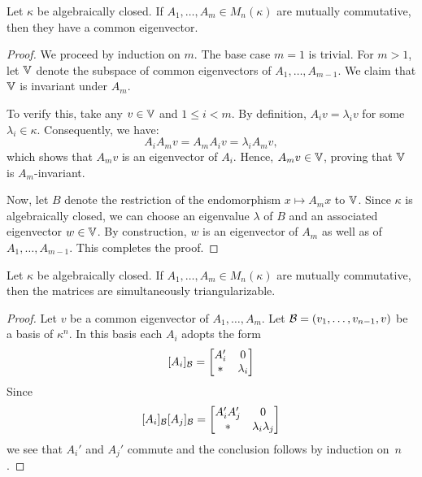 \begin{lem}\label{lem:common-eigenvector}
    Let\/ $\kappa$ be algebraically closed. If\/ $A_1,\dots, A_m\in M_n(\kappa)$ are mutually commutative, then they have a common eigenvector.
\end{lem}

\begin{proof}
    We proceed by induction on $m$. The base case $m=1$ is trivial. For $m > 1$, let $\mathbb V$ denote the subspace of common eigenvectors of $A_1, \dots, A_{m-1}$. We claim that $\mathbb V$ is invariant under $A_m$. 

    To verify this, take any $v \in \mathbb V$ and $1 \leq i < m$. By definition, $A_i v = \lambda_i v$ for some $\lambda_i \in \kappa$. Consequently, we have:
    $$
        A_i A_m v = A_m A_i v = \lambda_i A_m v,
    $$
    which shows that $A_m v$ is an eigenvector of $A_i$. Hence, $A_m v \in \mathbb V$, proving that $\mathbb V$ is $A_m$-invariant.
    
    Now, let $B$ denote the restriction of the endomorphism $x \mapsto A_m x$ to $\mathbb V$. Since $\kappa$ is algebraically closed, we can choose an eigenvalue $\lambda$ of $B$ and an associated eigenvector $w \in \mathbb V$. By construction, $w$ is an eigenvector of $A_m$ as well as of $A_1, \dots, A_{m-1}$. This completes the proof.
\end{proof}


\begin{prop}\label{prop:simultaneous-traingularization}
    Let\/ $\kappa$ be algebraically closed. If $A_1,\dots, A_m \in M_n(\kappa)$ are mutually commutative, then the matrices are simultaneously triangularizable.
\end{prop}

\begin{proof}
    Let $v$ be a common eigenvector of $A_1,\dots,A_m$. Let $\mathcal B=(v_1,\dots,v_{n-1},v)$ be a basis of $\kappa^n$. In this basis each $A_i$ adopts the form
    $$
        [A_i]_{\mathcal B} = \begin{bmatrix}
                A_i'    &0\\
                *   &\lambda_i
            \end{bmatrix}
    $$
    Since
    $$
        [A_i]_{\mathcal B}[A_j]_{\mathcal B} = \begin{bmatrix}
                A_i'A_j'    &0\\
                *   &\lambda_i\lambda_j
            \end{bmatrix}
    $$
    we see that $A_i'$ and $A_j'$ commute and the conclusion follows by induction on~$n$.
\end{proof}


